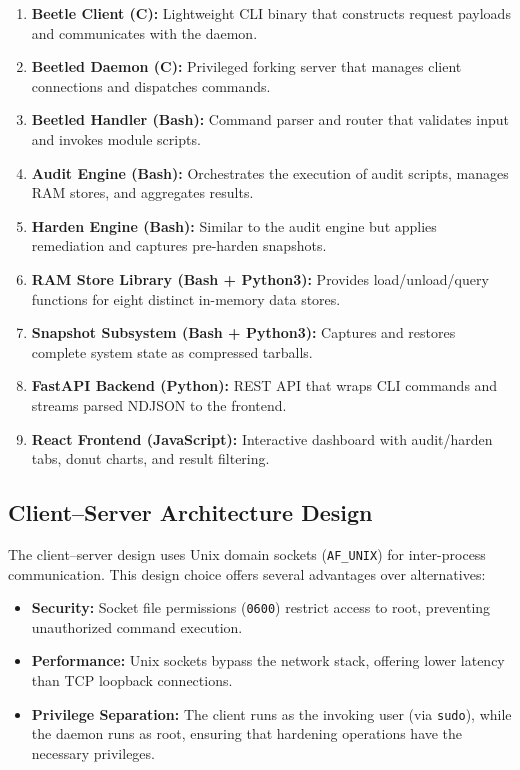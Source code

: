 \begin{enumerate}[noitemsep]
    \item \textbf{Beetle Client (C):} Lightweight CLI binary that constructs request payloads and communicates with the daemon.
    \item \textbf{Beetled Daemon (C):} Privileged forking server that manages client connections and dispatches commands.
    \item \textbf{Beetled Handler (Bash):} Command parser and router that validates input and invokes module scripts.
    \item \textbf{Audit Engine (Bash):} Orchestrates the execution of audit scripts, manages RAM stores, and aggregates results.
    \item \textbf{Harden Engine (Bash):} Similar to the audit engine but applies remediation and captures pre-harden snapshots.
    \item \textbf{RAM Store Library (Bash + Python3):} Provides load/unload/query functions for eight distinct in-memory data stores.
    \item \textbf{Snapshot Subsystem (Bash + Python3):} Captures and restores complete system state as compressed tarballs.
    \item \textbf{FastAPI Backend (Python):} REST API that wraps CLI commands and streams parsed NDJSON to the frontend.
    \item \textbf{React Frontend (JavaScript):} Interactive dashboard with audit/harden tabs, donut charts, and result filtering.
\end{enumerate}

\subsection{Client--Server Architecture Design}

The client--server design uses Unix domain sockets (\texttt{AF\_UNIX}) for inter-process communication. This design choice offers several advantages over alternatives:

\begin{itemize}[noitemsep]
    \item \textbf{Security:} Socket file permissions (\texttt{0600}) restrict access to root, preventing unauthorized command execution.
    \item \textbf{Performance:} Unix sockets bypass the network stack, offering lower latency than TCP loopback connections.
    \item \textbf{Privilege Separation:} The client runs as the invoking user (via \texttt{sudo}), while the daemon runs as root, ensuring that hardening operations have the necessary privileges.
\end{itemize}

